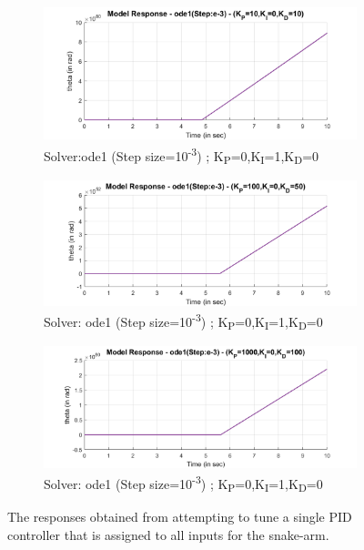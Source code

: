\documentclass[a4paper,12pt]{report}
\begin{document}
\begin{figure}[H]
	\begin{subfigure}{\textwidth}
		\centering
		\includegraphics[width=\linewidth]{images/ode1-comp-10-0-10.png}  
		\caption{Solver:ode1 (Step size=10\textsuperscript{-3})  ; K\textsubscript{P}=0,K\textsubscript{I}=1,K\textsubscript{D}=0}
	\end{subfigure}
	\begin{subfigure}{\textwidth}
		\centering
		\includegraphics[width=\linewidth]{images/ode1-comp-100-0-50.png}  
		\caption{Solver: ode1 (Step size=10\textsuperscript{-3}) ; K\textsubscript{P}=0,K\textsubscript{I}=1,K\textsubscript{D}=0}
	\end{subfigure}
	\begin{subfigure}{\textwidth}
		\centering
		\includegraphics[width=\linewidth]{images/ode1-comp-1000-0-100.png}  
		\caption{Solver: ode1 (Step size=10\textsuperscript{-3}) ; K\textsubscript{P}=0,K\textsubscript{I}=1,K\textsubscript{D}=0}
	\end{subfigure}
	\caption{The responses obtained from attempting to tune a single PID controller that is assigned to all inputs for the snake-arm.}
	\label{lumped-responses}
\end{figure}
\end{document}
